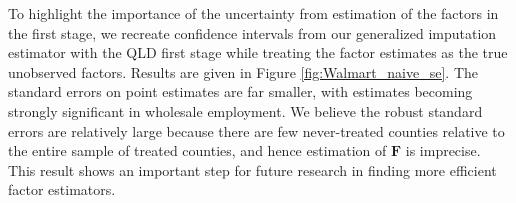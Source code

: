\documentclass[12pt]{article}
\begin{document}
\begin{figure}
\end{figure}

To highlight the importance of the uncertainty from estimation of the factors in the first stage, we recreate confidence intervals from our generalized imputation estimator with the QLD first stage while treating the factor estimates as the true unobserved factors. Results are given in Figure \ref{fig:Walmart_naive_se}. The standard errors on point estimates are far smaller, with estimates becoming strongly significant in wholesale employment. We believe the robust standard errors are relatively large because there are few never-treated counties relative to the entire sample of treated counties, and hence estimation of $\bm{F}$ is imprecise. This result shows an important step for future research in finding more efficient factor estimators. 
\end{document}
